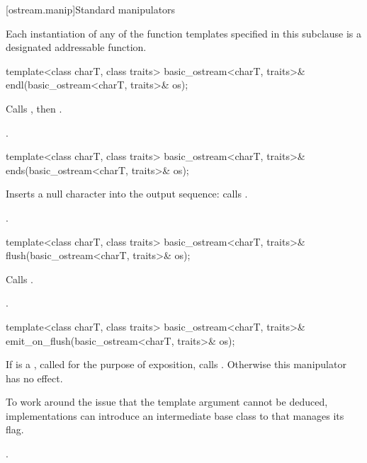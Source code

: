 [ostream.manip]{Standard  manipulators}

\pnum
Each instantiation of any of the function templates
specified in this subclause
is a designated addressable function.

%
\begin{itemdecl}
template<class charT, class traits>
  basic_ostream<charT, traits>& endl(basic_ostream<charT, traits>& os);
\end{itemdecl}

\begin{itemdescr}
\pnum
\effects
Calls
,
then
.

\pnum
\returns
{}.
\end{itemdescr}

%
\begin{itemdecl}
template<class charT, class traits>
  basic_ostream<charT, traits>& ends(basic_ostream<charT, traits>& os);
\end{itemdecl}

\begin{itemdescr}
\pnum
\effects
Inserts a null character into the output sequence:
calls
.

\pnum
\returns
{}.
\end{itemdescr}

%
\begin{itemdecl}
template<class charT, class traits>
  basic_ostream<charT, traits>& flush(basic_ostream<charT, traits>& os);
\end{itemdecl}

\begin{itemdescr}
\pnum
\effects
Calls
.

\pnum
\returns
{}.
\end{itemdescr}

%
\begin{itemdecl}
template<class charT, class traits>
  basic_ostream<charT, traits>& emit_on_flush(basic_ostream<charT, traits>& os);
\end{itemdecl}

\begin{itemdescr}
\pnum
\effects
If  is a
,
called  for the purpose of exposition,
calls .
Otherwise this manipulator has no effect.
\begin{note}
To work around the issue that the
 template argument cannot be deduced,
implementations can introduce an intermediate base class
to  that manages its  flag.
\end{note}

\pnum
\returns
{}.
\end{itemdescr}

